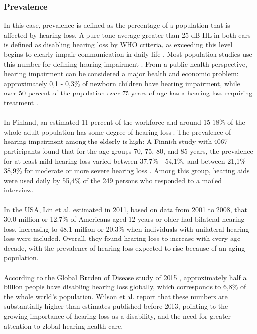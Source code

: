\documentclass[english, 12pt, a4paper, pdftex, elec, utf8]{aaltothesis}
\begin{document}
\subsubsection{Prevalence}

In this case, prevalence is defined as the percentage of a population that is affected by hearing loss. A pure tone average greater than 25 dB HL in both ears is defined as disabling hearing loss by WHO criteria, as exceeding this level begins to clearly impair communication in daily life \cite{salonen2013hearing}. Most population studies use this number for defining hearing impairment \cite{salonen2013hearing, lin2011hearing}. From a public health perspective,  hearing impairment can be considered a major health and economic problem: approximately 0,1 - 0,3\% of newborn children have hearing impairment, while over 50 percent of the population over 75 years of age has a hearing loss requiring treatment \cite{salonen2013hearing}.  \\\\
In Finland, an estimated 11 percent of the workforce and around 15-18\% of the whole adult population has some degree of hearing loss \cite{koskela2013kuulokojeen, salonen2013hearing}. The prevalence of hearing impairment among the elderly is high: A Finnish study with 4067 participants found that for the age groups 70, 75, 80, and 85 years, the prevalence for at least mild hearing loss varied between 37,7\% - 54,1\%, and between 21,1\% - 38,9\% for moderate or more severe hearing loss \cite{salonen2013hearing}. Among this group, hearing aids were used daily by 55,4\% of the 249 persons who responded to a mailed interview. \\\\
In the USA, Lin et al. \cite{lin2011hearing} estimated in 2011, based on data from 2001 to 2008, that 30.0 million or 12.7\% of Americans aged 12 years or older had bilateral hearing loss, increasing to 48.1 million or 20.3\% when individuals with unilateral hearing loss were included. Overall, they found hearing loss to increase with every age decade, with the prevalence of hearing loss expected to rise because of an aging population. \\\\
According to the Global Burden of Disease study of 2015 \cite{wilson2017global}, approximately half a billion people have disabling hearing loss globally, which corresponds to 6,8\% of the whole world's population. Wilson et al. \cite{wilson2017global} report that these numbers are substantially higher than estimates published before 2013, pointing to the growing importance of hearing loss as a disability, and the need for greater attention to global hearing health care.
\end{document}
